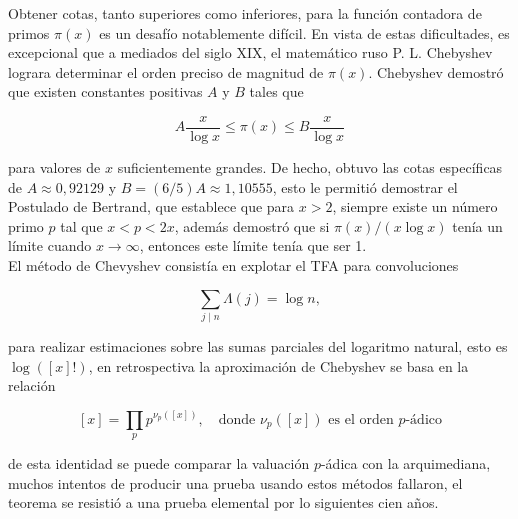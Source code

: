 
\thispagestyle{empty}
\vspace{-0.7cm}


Obtener cotas, tanto superiores como inferiores, para la función contadora de primos $\pi(x)$ es un desafío notablemente difícil. En vista de estas dificultades, es excepcional que a mediados del siglo XIX, el matemático ruso P. L. Chebyshev lograra determinar el orden preciso de magnitud de $\pi(x)$. Chebyshev demostró que existen constantes positivas $A$ y $B$ tales que

$$
A \frac{x}{\log x} \leq \pi(x) \leq B \frac{x}{\log x}
$$


para valores de $x$ suficientemente grandes. De hecho, obtuvo las cotas específicas de $A\approx 0,92129$ y $B=(6/5) A \approx 1,10555$, esto le permitió demostrar el Postulado de Bertrand, que establece que para $x>2$, siempre existe un número primo $p$ tal que $x<p<2 x$, además demostró que si $\pi(x)/(x\log x)$ tenía un límite cuando $x\to \infty$, entonces este límite tenía que ser 1.\\

El método de Chevyshev consistía en explotar el TFA para convoluciones 

$$\sum_{j \mid n}\Lambda(j)=\log n,$$

para realizar estimaciones sobre las sumas parciales del logaritmo natural, esto es $\log([x]!)$, en retrospectiva la aproximación de Chebyshev se basa en la relación

\[
[x] = \prod_{p} p^{\nu_p([x])}, \quad \text{donde } \nu_p([x]) \text{ es el orden } p\text{-ádico}
\]


 de esta identidad se puede comparar la valuación $p$-ádica con la arquimediana, muchos intentos de producir una prueba usando estos métodos fallaron, el teorema se resistió a una prueba elemental por lo siguientes cien años.\\


